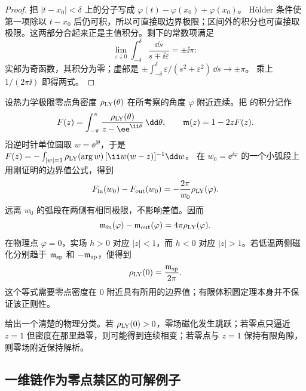 \begin{proof}
把 \(|t-x_0|<\delta\) 上的分子写成
\(\varphi(t)-\varphi(x_0)+\varphi(x_0)\)。
Hölder 条件使第一项除以 \(t-x_0\) 后仍可积，所以可直接取边界极限；区间外的积分也可直接取极限。这两部分合起来正是主值积分。剩下的常数项满足
\[
\lim_{\varepsilon\downarrow0}
\int_{-\delta}^{\delta}\frac{\dd s}{s\mp\ii\varepsilon}
=\pm\ii\pi:
\]
实部为奇函数，其积分为零；虚部是
\(\pm\int_{-\delta}^{\delta}\varepsilon/(s^2+\varepsilon^2)\,\dd s
\to\pm\pi\)。
乘上 \(1/(2\pi\ii)\) 即得两式。
\end{proof}

设热力学极限零点角密度 \(\rho_{\rm LY}(\theta)\) 在所考察的角度 \(\varphi\) 附近连续。把 的积分记作
\[
F(z)=\int_{-\pi}^{\pi}
\frac{\rho_{\rm LY}(\theta)}{z-\ee^{\ii\theta}}\,\dd\theta,
\qquad \mathfrak m(z)=1-2zF(z).
\]
沿逆时针单位圆取 \(w=\ee^{\ii\theta}\)，于是
\(F(z)=-\int_{|w|=1}\rho_{\rm LY}(\arg w)
\,[\ii w(w-z)]^{-1}\dd w\)。
在 \(w_0=\ee^{\ii\varphi}\) 的一个小弧段上用刚证明的边界值公式，得到
\[
F_{\rm in}(w_0)-F_{\rm out}(w_0)
=-\frac{2\pi}{w_0}\rho_{\rm LY}(\varphi).
\]
远离 \(w_0\) 的弧段在两侧有相同极限，不影响差值。因而
\begin{equation}
\mathfrak m_{\rm in}(\varphi)-\mathfrak m_{\rm out}(\varphi)
=4\pi\rho_{\rm LY}(\varphi).
\label{eq:phys-sm-mag-jump}
\end{equation}
在物理点 \(\varphi=0\)，实场 \(h>0\) 对应 \(|z|<1\)，而 \(h<0\) 对应 \(|z|>1\)。若低温两侧磁化分别趋于
\(\mathfrak m_{\rm sp}\) 和 \(-\mathfrak m_{\rm sp}\)，便得到
\[
\rho_{\rm LY}(0)=\frac{\mathfrak m_{\rm sp}}{2\pi}.
\]
这个等式需要零点密度在 \(0\) 附近具有所用的边界值；有限体积圆定理本身并不保证该正则性。

 给出一个清楚的物理分类。若 \(\rho_{\rm LY}(0)>0\)，零场磁化发生跳跃；若零点只逼近 \(z=1\) 但密度在那里趋零，则可能得到连续相变；若零点与 \(z=1\) 保持有限角隙，则零场附近保持解析。

\subsection{一维链作为零点禁区的可解例子}
\label{sec:phys-sm-1d-ising}

